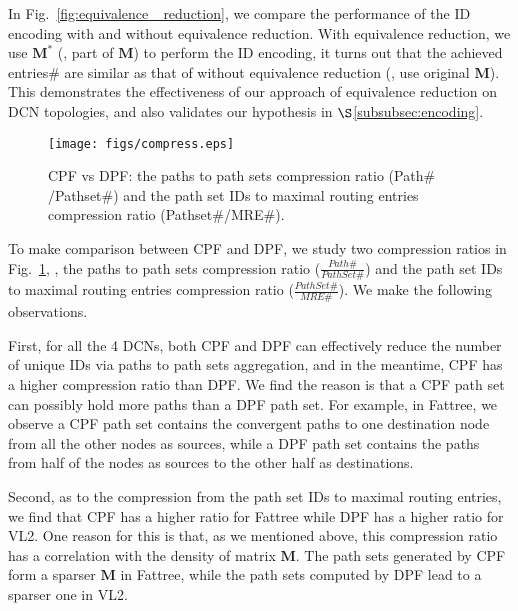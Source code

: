 In Fig.~\ref{fig:equivalence _reduction}, we compare the performance of the ID encoding with and without equivalence reduction. With equivalence reduction, we use $\mathbf{M^*}$ (\ie, part of $\mathbf{M}$) to perform the ID encoding, it turns out that the achieved entries$\#$ are similar as that of without equivalence reduction (\ie, use original $\mathbf{M}$). This demonstrates the effectiveness of our approach of equivalence reduction on DCN topologies, and also validates our hypothesis in $\S$\ref{subsubsec:encoding}.

\begin{figure}[t]
\hspace{-0.1in}
\texttt{[image: figs/compress.eps]}
\vspace{-0.23in}
\caption{CPF vs DPF: the paths to path sets compression ratio (Path$\#$/Pathset$\#$) and the path set IDs to maximal routing entries compression ratio (Pathset$\#$/MRE$\#$).}\label{fig:CPFvsDPF}
\vspace{-0.1in}
\end{figure}

To make comparison between CPF and DPF, we study two compression ratios in Fig.~\ref{fig:CPFvsDPF}, \ie, the paths to path sets compression ratio ($\frac{Path\#}{PathSet\#}$) and the path set IDs to maximal routing entries compression ratio ($\frac{PathSet\#}{MRE\#}$). We make the following observations.

First, for all the 4 DCNs, both CPF and DPF can effectively reduce the number of unique IDs via paths to path sets aggregation, and in the meantime, CPF has a higher compression ratio than DPF. We find the reason is that a CPF path set can possibly hold more paths than a DPF path set. For example, in Fattree, we observe a CPF path set contains the convergent paths to one destination node from all the other nodes as sources, while a DPF path set contains the paths from half of the nodes as sources to the other half as destinations.

Second, as to the compression from the path set IDs to maximal routing entries, we find that CPF has a higher ratio for Fattree while DPF has a higher ratio for VL2. One reason for this is that, as we mentioned above, this compression ratio has a correlation with the density of matrix $\mathbf{M}$. The path sets generated by CPF form a sparser $\mathbf{M}$ in Fattree, while the path sets computed by DPF lead to a sparser one in VL2.

